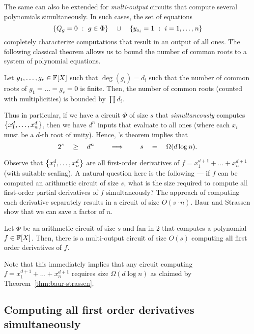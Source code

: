 \documentclass[12pt]{report}
\begin{document}
The same can also be extended for \emph{multi-output} circuits that compute several polynomials simultaneously. In such cases, the set of equations
$$\left\{{Q_g = 0}\ : \ {g\in \Phi}\right\} \quad \cup \quad \left\{{y_{o_i} = 1}\ : \ {i=1, \ldots, n}\right\}$$
completely characterize computations that result in an output of all ones. The following classical theorem allows us to bound the number of  common roots to a system of polynomial equations. 

\begin{theorem}
  Let $g_1,\dots, g_r \in \mathbb{F}[X]$ such that $\deg(g_i) = d_i$ such that the number of common roots of $g_1=\dots=g_r = 0$ is finite. Then, the number of common roots (counted with multiplicities) is bounded by $\prod d_i$.
\end{theorem}

Thus in particular, if we have a circuit $\Phi$ of size $s$ that \emph{simultaneously} computes $\left\{x_1^d, \dots,x_n^d\right\}$, then we have $d^n$ inputs that evaluate to all ones (where each $x_i$ must be  a $d$-th root of unity). Hence, \Bezout's theorem implies that
$$
2^s\quad \geq \quad d^n \quad \quad\implies\quad \quad s \quad = \quad \Omega(d\log n).
$$

Observe that $\left\{x_1^d,\dots, x_n^d\right\}$ are all first-order derivatives of $f = x_1^{d+1}+\dots+x_n^{d+1}$ (with suitable scaling). A natural question here is the following --- if $f$ can be computed an arithmetic circuit of size $s$, what is the size required to compute all first-order partial derivatives of $f$ simultaneously? The \naive approach of computing each derivative separately results in a circuit of size $O(s\cdot n)$. Baur and Strassen \cite{BS83} show that we can save a factor of $n$.

\begin{lemma}[\cite{BS83}]\label{lem:baur-strassen}
  Let $\Phi$ be an arithmetic circuit of size $s$ and fan-in $2$ that computes a polynomial $f\in \mathbb{F}[X]$. Then, there is a multi-output circuit  of size $O(s)$ computing all first order derivatives of $f$.
\end{lemma}

Note that this immediately implies that any circuit computing $f = x_1^{d+1} + \dots + x_n^{d+1}$ requires size $\Omega(d\log n)$ as claimed by Theorem~\ref{thm:baur-strassen}. 


\subsection{Computing all first order derivatives simultaneously}
\end{document}

